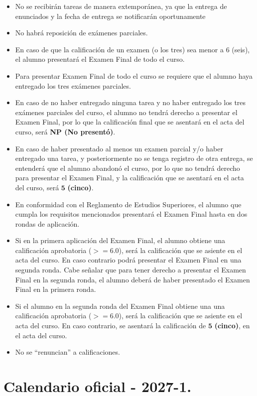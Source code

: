 \documentclass[12pt]{article}
\numberwithin{equation}{section}
\begin{document}
\begin{itemize}
\setlength{\itemsep}{0mm}
\item No se recibirán tareas de manera extemporánea, ya que la entrega de enunciados y la fecha de entrega se notificarán oportunamente
\item No habrá reposición de exámenes parciales.
\item En caso de que la calificación de un examen (o los tres) sea menor a $6$ (seis), el alumno presentará el Examen Final de todo el curso.
\item Para presentar Examen Final de todo el curso se requiere que el alumno haya entregado los tres exámenes parciales.
\item En caso de no haber entregado ninguna tarea y no haber entregado los tres exámenes parciales del curso, el alumno no tendrá derecho a presentar el Examen Final, por lo que la calificación final que se asentará en el acta del curso, será \textbf{NP (No presentó)}.
\item En caso de haber presentado al menos un examen parcial y/o haber entregado una tarea, y posteriormente no se tenga registro de otra entrega, se entenderá que el alumno abandonó el curso, por lo que no tendrá derecho para presentar el Examen Final, y la calificación que se asentará en el acta del curso, será $\mathbf{5}$ \textbf{(cinco)}.
\item En conformidad con el Reglamento de Estudios Superiores, el alumno que cumpla los requisitos mencionados presentará el Examen Final hasta en dos rondas de aplicación.
\item Si en la primera aplicación del Examen Final, el alumno obtiene una calificación aprobatoria ($>=6.0$), será la calificación que se asiente en el acta del curso. En caso contrario podrá presentar el Examen Final en una segunda ronda. Cabe señalar que para tener derecho a presentar el Examen Final en la segunda ronda, el alumno deberá de haber presentado el Examen Final en la primera ronda.
\item Si el alumno en la segunda ronda del Examen Final obtiene una  una calificación aprobatoria ($>=6.0$), será la calificación que se asiente en el acta del curso. En caso contrario, se asentará la calificación de $\mathbf{5}$ \textbf{(cinco)}, en el acta del curso.
\item No se \enquote{renuncian} a calificaciones.
\end{itemize}

\section{Calendario oficial - 2027-1.}
\end{document}
